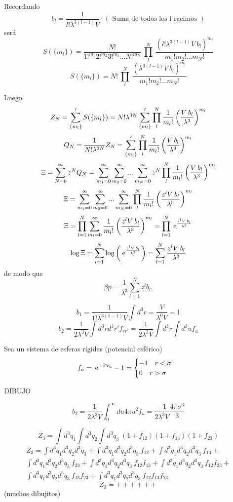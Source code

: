 \documentclass[10pt,oneside]{CBFT_book}
\begin{document}
Recordando 
\[
	b_l = \frac{ 1 }{ l! \lambda^{3(l-1)} V }\cdot ( \text{ Suma de todos los l-racimos } )
\]
será 
\[
	S( \{ m_l \} ) = \frac{N!}{ 1!^{m_1} 2!^{m_2} 3!^{m_3} ... N!^{m_N} } \: \prod_{l}^N \: 
	\frac{ ( l! \lambda^{3(l-1)} V \: b_l )^{ m_l } }{ m_1! m_2! ... m_N! }
\]
\[
	S( \{ m_l \} ) = N! \: \prod_{l}^N \: 
	\frac{ ( \lambda^{3(l-1)} V \: b_l )^{ m_l } }{ m_1! m_2! ... m_N! }
\]

Luego
\[
	Z_N = \sum_{\{ m_l \} } ' S( \{ m_l \} ) = N! \lambda^{3N}  \sum_{\{ m_l \} }' \prod_{l}^N 
	\frac{1}{m_l!} \left( \frac{  V \: b_l  }{  \lambda^3  } \right)^{m_l}
\]
\[
	Q_N = \frac{1}{N! \lambda^{3N}} Z_N = 
	\sum_{\{ m_l \} }' \prod_{l}^N \frac{1}{m_l!} \left( \frac{  V \: b_l  }{  \lambda^3  } \right)^{m_l}
\]
\[
	\Xi = \sum_{N=0}^\infty z^N Q_N =  \sum_{m_1=0}^\infty \sum_{m_2=0}^\infty ...  \sum_{m_N=0}^\infty
	z^N \prod_{l}^N \frac{1}{m_l!} \left( \frac{  V \: b_l  }{  \lambda^3  } \right)^{m_l}
\]
\[
	\Xi = \sum_{m_1=0}^\infty \sum_{m_2=0}^\infty ...  \sum_{m_N=0}^\infty
	\prod_{l}^N \frac{1}{m_l!} \left( \frac{  z^l V \: b_l  }{  \lambda^3  } \right)^{m_l}
\]
\[
	\Xi = \prod_{l=1}^N \sum_{m_l=0}^\infty \frac{1}{m_l!} \left( \frac{  z^l V \: b_l  }{  \lambda^3  } \right)^{m_l}
	= \prod_{l=1}^N \:\mathrm{e}^{ \frac{ z^l V \: b_l }{ \lambda^3 } }
\]
\[
	\log \Xi = \sum_{l=1}^N \log\left( \:\mathrm{e}^{ \frac{ z^l V \: b_l }{ \lambda^3 } } \right) =
	\sum_{l=1}^N  \frac{ z^l V \: b_l }{ \lambda^3 }
\]
de modo que 
\[
	\beta p = \frac{ 1 }{ \lambda^3 } \sum_{l=1}^N  z^l b_l .
\]
	
\[
	b_1 = \frac{1}{1!\lambda^{3(1-1)}V} \int d^3r = \frac{V}{\lambda^0 V} = 1
\]
\[
	b_2 = \frac{1}{2\lambda^3 V} \int d^3r d^3r' f_{rr'} = \frac{1}{2\lambda^3 V} \int d^3r \int d^3u f_u
\]

Sea un sistema de esferas rígidas (potencial esférico)
\[
	f_u = \:\mathrm{e}^{-\beta V_u} - 1 = \begin{cases}
	                                 -1 \quad r < \sigma \\
	                                  0 \quad r > \sigma
	                                \end{cases}
\]

DIBUJO 

\[
	b_2 = \frac{1}{2\lambda^3 V} \int_0^\infty du 4 \pi u^2 f_u = \frac{-1}{2\lambda^3 V} \frac{4\pi\sigma^3}{3}
\]

\[
	Z_3 = \int d^3q_1 \int d^3q_2 \int d^3q_3 \; ( 1 + f_{12} ) ( 1 + f_{13} ) ( 1 + f_{23} )
\]
\begin{multline*}
	Z_3 = 	\int d^3q_1 d^3q_2 d^3q_3 + \int d^3q_1 d^3q_2 d^3q_3 \: f_{12} +
	\int d^3q_1 d^3q_2 d^3q_3 \: f_{13} + \\ \int d^3q_1 d^3q_2 d^3q_3 \: f_{23} +
	\int d^3q_1 d^3q_2 d^3q_3 \: f_{12}f_{13}  + \int d^3q_1 d^3q_2 d^3q_3 \: f_{12}f_{23} + \\
	\int d^3q_1 d^3q_2 d^3q_3 \: f_{13}f_{23} + \int d^3q_1 d^3q_2 d^3q_3 \: f_{12}f_{13}f_{23} 
\end{multline*}
\[
	Z_3 = + + + + + + 
\]
(muchos dibujitos)
\end{document}
